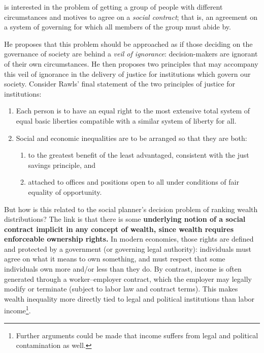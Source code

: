 \documentclass[Chp3.tex]{subfiles}
\begin{document}
\par \cite{jr71} is interested in the problem of getting a group of people with different circumstances and motives to agree on a \textit{social contract}; that is, an agreement on a system of governing for which all members of the group must abide by.

\par He proposes that this problem should be approached as if those deciding on the governance of society are behind a \textit{veil of ignorance}: decision-makers are ignorant of their own circumstances. He then proposes two principles that may accompany this veil of ignorance in the delivery of justice for institutions which govern our society. Consider Rawls' final statement of the two principles of justice for institutions:

\begin{enumerate}
\item Each person is to have an equal right to the most extensive total system of equal basic liberties compatible with a similar system of liberty for all.

\item Social and economic inequalities are to be arranged so that they are both:

\begin{enumerate}
\item to the greatest benefit of the least advantaged, consistent with the just savings principle, and
\item attached to offices and positions open to all under conditions of fair equality of opportunity.
\end{enumerate}
\end{enumerate}

\par But how is this related to the social planner's decision problem of ranking wealth distributions? The link is that there is some \textbf{underlying notion of a social contract implicit in any concept of wealth, since wealth requires enforceable ownership rights.} In modern economies, those rights are defined and protected by a government (or governing legal authority): individuals must agree on what it means to own something, and must respect that some individuals own more and/or less than they do. By contrast, income is often generated through a worker--employer contract, which the employer may legally modify or terminate (subject to labor law and contract terms). This makes wealth inequality more directly tied to legal and political institutions than labor income\footnote{Further arguments could be made that income suffers from legal and political contamination as well.}.
\end{document}
